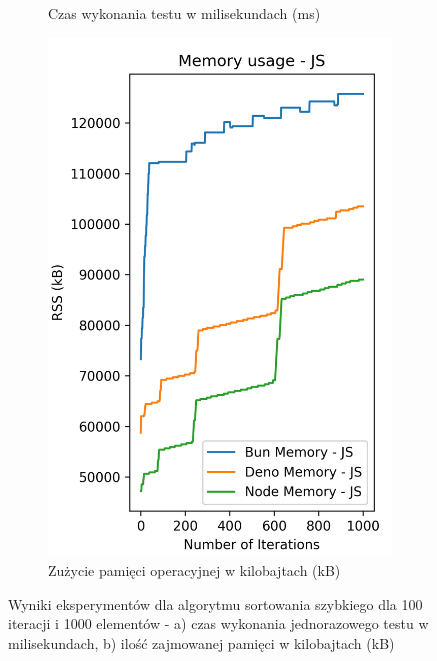 \begin{figure}[H]
\begin{subfigure}[b]{0.44\textwidth}
    \caption{Czas wykonania testu w milisekundach (ms)}
    \label{fig:quick_sorting_e2_time}
  \end{subfigure}
  \begin{subfigure}[b]{0.44\textwidth}
    \centering
    \includegraphics[width=\textwidth]{Figures/sorting/sorting_quick_1000_1000_js_memory.png}
    \caption{Zużycie pamięci operacyjnej w kilobajtach (kB)}
    \label{fig:quick_sorting_e2_memory}
  \end{subfigure}
  \caption{Wyniki eksperymentów dla algorytmu sortowania szybkiego dla 100 iteracji i 1000 elementów - a) czas wykonania jednorazowego testu w milisekundach, b) ilość zajmowanej pamięci w kilobajtach (kB)}
  \label{fig:quick_sorting_e2}
\end{figure}

